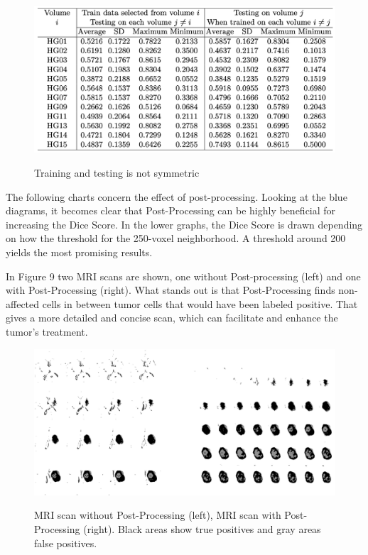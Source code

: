 \documentclass[
12pt,
headsepline,
bibliography=totoc,
twoside=semi,
fleqn
]{scrartcl}
\begin{document}
 \begin{figure}[H]
 \centering \includegraphics[scale=0.7]{BDT17.png}\label{fig:fig17}
 \caption{Training and testing is not symmetric}
 \end{figure} 

 The following charts concern the effect of post-processing. Looking at the blue diagrams, it becomes clear that Post-Processing can be highly beneficial for increasing the Dice Score. In the lower graphs, the Dice Score is drawn depending on how the threshold for the 250-voxel neighborhood. A threshold around 200 yields the most promising results. 


 In Figure 9 two MRI scans are shown, one without Post-processing (left) and one with Post-Processing (right). What stands out is that Post-Processing finds non-affected cells in between tumor cells that would have been labeled positive. That gives a more detailed and concise scan, which can facilitate and enhance the tumor's treatment. 

 \begin{figure}[H]
 \centering \includegraphics[scale=0.5]{BDT19.png}\label{fig:fig19}
 \caption{MRI scan without Post-Processing (left), MRI scan with Post-Processing (right). Black areas show true positives and gray areas false positives.}
 \end{figure} 
\end{document}
